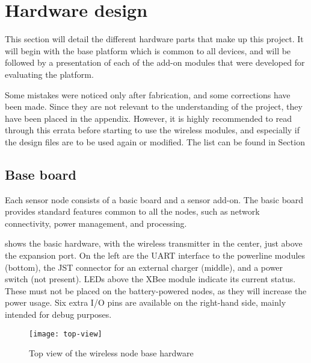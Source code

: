 \pagebreak
\section{Hardware design}

This section will detail the different hardware parts that make up this project. 
It will begin with the base platform which is common to all devices, and will be
followed by a presentation of each of the add-on modules that were developed for
evaluating the platform.

Some mistakes were noticed only after fabrication, and some corrections have
been made. Since they are not relevant to the understanding of the project, they
have been placed in the appendix. However, it is highly recommended to read
through this errata before starting to use the wireless modules, and especially
if the design files are to be used again or modified. The list can be found in
Section 

\subsection{Base board}

Each sensor node consists of a basic board and a sensor add-on. The basic board
provides standard features common to all the nodes, such as network
connectivity, power management, and processing.

 shows the basic hardware, with the wireless transmitter
in the center, just above the expansion port. On the left are the UART interface
to the powerline modules (bottom), the JST connector for an external charger
(middle), and a power switch (not present). LEDs above the XBee module indicate
its current status. These must not be placed on the battery-powered nodes, as
they will increase the power usage. Six extra I/O pins are available on the
right-hand side, mainly intended for debug purposes.

\begin{figure}[h]
  \begin{center}
    \texttt{[image: top-view]}
  \end{center}
  \caption{Top view of the wireless node base hardware}
  \label{fig:base-topview}
\end{figure}

